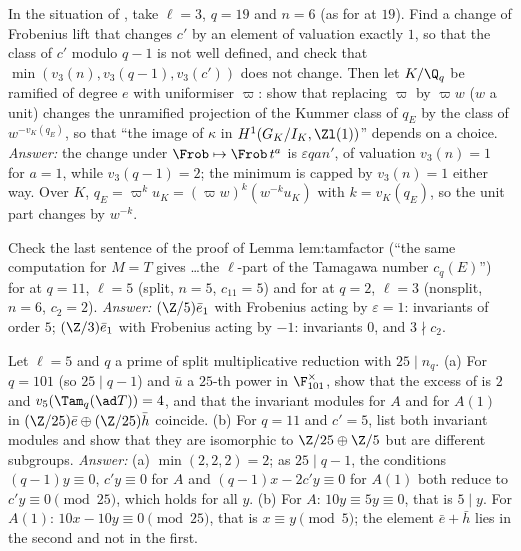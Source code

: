 \begin{exercise}\label{ex:blochkato:ex-cprime}
In the situation of , take $\ell=3$, $q=19$ and $n=6$ (as for  at $19$). Find a change of Frobenius lift that changes $c'$ by an
element of valuation exactly $1$, so that the class of $c'$ modulo $q-1$ is not well defined, and check that $\min(v_3(n),v_3(q-1),v_3(c'))$ does not change. Then let $K/\Q_q$ be
ramified of degree $e$ with uniformiser $\varpi$: show that replacing $\varpi$ by $\varpi w$ ($w$ a unit) changes the unramified projection of the Kummer class of $q_E$ by the class of
$w^{-v_K(q_E)}$, so that ``the image of $\kappa$ in $H^1(G_K/I_K,\Zl(1))$'' depends on a choice.
\emph{Answer:} the change under $\Frob\mapsto\Frob\,t^a$ is $\varepsilon qan'$, of valuation $v_3(n)=1$ for $a=1$, while $v_3(q-1)=2$; the minimum is capped by $v_3(n)=1$ either way.
Over $K$, $q_E=\varpi^{k}u_K=(\varpi w)^{k}(w^{-k}u_K)$ with $k=v_K(q_E)$, so the unit part changes by $w^{-k}$.
\end{exercise}

\begin{exercise}\label{ex:blochkato:ex-tam-T}
Check the last sentence of the proof of Lemma lem:tamfactor (``the same computation for $M=T$ gives \dots the $\ell$-part of the Tamagawa number $c_q(E)$'') for  at $q=11$,
$\ell=5$ (split, $n=5$, $c_{11}=5$) and for  at $q=2$, $\ell=3$ (nonsplit, $n=6$, $c_2=2$).
\emph{Answer:} $(\Z/5)\bar e_1$ with Frobenius acting by $\varepsilon=1$: invariants of order $5$; $(\Z/3)\bar e_1$ with Frobenius acting by $-1$: invariants $0$, and $3\nmid c_2$.
\end{exercise}

\begin{exercise}[$\Tam(A(1))=\Tam(A)$ at $\ell=5$]\label{ex:blochkato:ex-tam-dual}
Let $\ell=5$ and $q$ a prime of split multiplicative reduction with $25\mid n_q$. (a) For $q=101$ (so $25\mid q-1$) and $\bar u$ a $25$-th power in $\F_{101}^\times$, show that the excess of
 is $2$ and $v_5(\Tam_q(\ad T))=4$, and that the invariant modules for $A$ and for $A(1)$ in $(\Z/25)\bar e\oplus(\Z/25)\bar h$ coincide. (b) For $q=11$ and
$c'=5$, list both invariant modules and show that they are isomorphic to $\Z/25\oplus\Z/5$ but are different subgroups.
\emph{Answer:} (a) $\min(2,2,2)=2$; as $25\mid q-1$, the conditions $(q-1)y\equiv0$, $c'y\equiv0$ for $A$ and $(q-1)x-2c'y\equiv0$ for $A(1)$ both reduce to $c'y\equiv0\pmod{25}$, which holds for all $y$.
(b) For $A$: $10y\equiv5y\equiv0$, that is $5\mid y$. For $A(1)$: $10x-10y\equiv0\pmod{25}$, that is $x\equiv y\pmod5$; the element $\bar e+\bar h$ lies in the second and not in the first.
\end{exercise}

